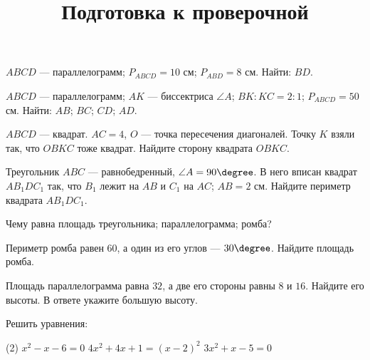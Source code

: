 \begin{class}[number=7]
	\title{Подготовка к проверочной}
	\begin{listofex}
		\item \( ABCD \) --- параллелограмм; \( P_{ABCD}=10 \) см; \( P_{ABD}=8 \)  см. Найти: \( BD \).
		\item \( ABCD \) --- параллелограмм; \( AK \) --- биссектриса \( \angle A \); \( BK:KC=2:1 \); \( P_{ABCD}=50 \) см. Найти: \( AB \); \( BC \); \( CD \); \( AD \).
		\item \( ABCD \) --- квадрат. \( AC=4 \), \( O \) --- точка пересечения диагоналей. Точку \( K \) взяли так, что \( OBKC \) тоже квадрат. Найдите сторону квадрата \( OBKC. \)
		\item Треугольник \( ABC \) --- равнобедренный, \( \angle A=90\degree \). В него вписан квадрат \( AB_1DC_1 \) так, что \( B_1 \) лежит на \( AB \) и \( C_1 \) на \( AC \); \( AB = 2 \) см. Найдите периметр квадрата \( AB_1DC_1  \).
		\item Чему равна площадь треугольника; параллелограмма; ромба?
		\item Периметр ромба равен \( 60 \), а один из его углов --- \( 30\degree \). Найдите площадь ромба.
		\item Площадь параллелограмма равна \( 32 \), а две его стороны равны \( 8 \) и \( 16 \). Найдите его высоты. В ответе укажите большую высоту.
		\item Решить уравнения:
		\begin{tasks}(2)
			\task \( x^2-x-6=0 \)
			\task \( 4x^2+4x+1=(x-2)^2 \)
			\task \( 3x^2+x-5=0 \)
		\end{tasks}
		\item {}
	\end{listofex}
\end{class}

